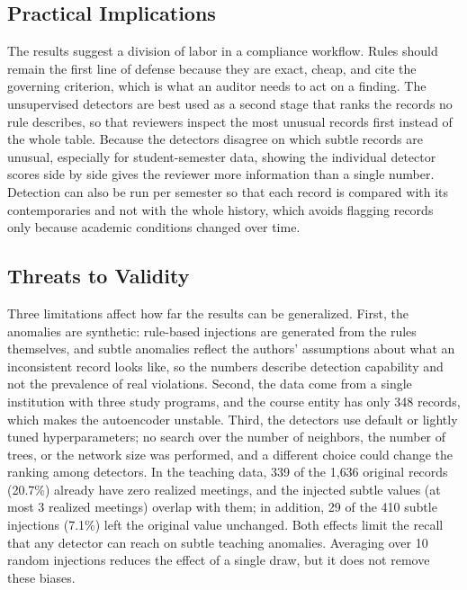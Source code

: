 \documentclass[conference]{IEEEtran}
\begin{document}
\subsection{Practical Implications}
The results suggest a division of labor in a compliance workflow. Rules should remain the first line of defense because they are exact, cheap, and cite the governing criterion, which is what an auditor needs to act on a finding. The unsupervised detectors are best used as a second stage that ranks the records no rule describes, so that reviewers inspect the most unusual records first instead of the whole table. Because the detectors disagree on which subtle records are unusual, especially for student-semester data, showing the individual detector scores side by side gives the reviewer more information than a single number. Detection can also be run per semester so that each record is compared with its contemporaries and not with the whole history, which avoids flagging records only because academic conditions changed over time.

\subsection{Threats to Validity}
Three limitations affect how far the results can be generalized. First, the anomalies are synthetic: rule-based injections are generated from the rules themselves, and subtle anomalies reflect the authors' assumptions about what an inconsistent record looks like, so the numbers describe detection capability and not the prevalence of real violations. Second, the data come from a single institution with three study programs, and the course entity has only 348 records, which makes the autoencoder unstable. Third, the detectors use default or lightly tuned hyperparameters; no search over the number of neighbors, the number of trees, or the network size was performed, and a different choice could change the ranking among detectors. In the teaching data, 339 of the 1{,}636 original records (20.7\%) already have zero realized meetings, and the injected subtle values (at most 3 realized meetings) overlap with them; in addition, 29 of the 410 subtle injections (7.1\%) left the original value unchanged. Both effects limit the recall that any detector can reach on subtle teaching anomalies. Averaging over 10 random injections reduces the effect of a single draw, but it does not remove these biases.
\end{document}
